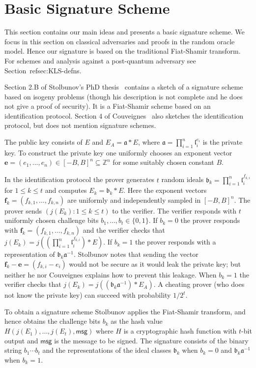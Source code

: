 \documentclass{llncs}
\newcommand{\Z}{\mathbb{Z}}
\newcommand{\msg}{\textsf{msg}}
\renewcommand{\a}{\mathfrak{a}}
\renewcommand{\b}{\mathfrak{b}}
\renewcommand{\l}{\mathfrak{l}}
\newcommand{\e}{\textbf{e}}
\newcommand{\f}{\textbf{f}}
\begin{document}
\section{Basic Signature Scheme}\label{sec:basic-scheme}

This section contains our main ideas and presents a basic signature scheme.
We focus in this section on classical adversaries and proofs in the random oracle model.
Hence our signature is based on the traditional Fiat-Shamir transform.
For schemes and analysis against a post-quantum adversary see Section~ref{sec:KLS-defns}.


Section 2.B of Stolbunov's PhD thesis~\cite{Sto12} contains a sketch of a signature scheme based on isogeny problems (though his description is not complete and he does not give a proof of security).
It is a Fiat-Shamir scheme based on an identification protocol.
Section 4 of Couveignes~\cite{Couv06} also sketches the identification protocol, but does not mention signature schemes.


The public key consists of $E$ and $E_A = \a * E$, where $\a = \prod_{i=1}^n \l_i^{e_i}$ is the private key.
To construct the private key one uniformly chooses an exponent vector $\e = (e_1, \dots, e_n) \in [-B,B]^n \subseteq \Z^n$ for some suitably chosen constant $B$.

In the identification protocol the prover generates $t$ random ideals $\b_k = \prod_{i=1}^n \l_i^{f_{k,i}}$ for $1 \le k \le t$ and computes $E_k = \b_k * E$.
Here the exponent vectors $\f_k = ( f_{k,1}, \dots, f_{k,n} )$ are uniformly and independently sampled in $[-B,B]^n$.
The prover sends $(j( E_k ) : 1 \le k \le t )$ to the verifier.
The verifier responds with $t$ uniformly chosen challenge bits $b_1, \dots, b_t \in \{0,1\}$.
If $b_k = 0$ the prover responds with $\f_k = ( f_{k,1}, \dots, f_{k,n} )$ and the verifier checks that $j(E_k) = j( (\prod_{i=1}^n \l_i^{f_{k,i}}) * E )$.
If $b_k = 1$ the prover responds with a representation of $\b_k \a^{-1}$. Stolbunov notes that sending the vector $\f_k - \e = (f_{k,i} - e_i )$ would not be secure as it would leak the private key; but neither he nor Couveignes explains how to prevent this leakage.
When $b_k=1$ the verifier checks that $j(E_k) = j( (\b_k \a^{-1}) * E_A )$.
A cheating prover (who does not know the private key) can succeed with probability $1/2^t$.

To obtain a signature scheme Stolbunov applies the Fiat-Shamir transform, and hence obtains the challenge bits $b_k$ as the hash value $H( j(E_1), \dots, j(E_t) , \msg )$ where $H$ is a cryptographic hash function with $t$-bit output and $\msg$ is the message to be signed.
The signature consists of the binary string $b_1\cdots b_t$ and the representations of the ideal classes $\b_k$ when $b_k = 0$ and $\b_k \a^{-1}$ when $b_k = 1$.
\end{document}
